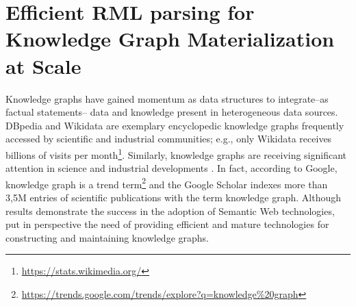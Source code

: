 \section{Efficient RML parsing for Knowledge Graph Materialization at Scale}
\label{chap7_rdfizer}
Knowledge graphs have gained momentum as data structures to integrate--as factual statements-- data and knowledge present in heterogeneous data sources. 
DBpedia and Wikidata are exemplary encyclopedic knowledge graphs frequently accessed by scientific and industrial communities; e.g., only Wikidata receives billions of visits per month\footnote{\url{https://stats.wikimedia.org/}}. 
Similarly, knowledge graphs are receiving significant attention in science and industrial developments \citep{AuerKPKSV18,NoyGJNPT19}. In fact, according to Google, knowledge graph is a trend term\footnote{\url{https://trends.google.com/trends/explore?q=knowledge\%20graph}} and the Google Scholar indexes more than 3,5M entries of scientific publications with the term knowledge graph.
Although results demonstrate the success in the adoption of Semantic Web technologies, put in perspective the need of providing efficient and mature technologies for constructing and maintaining knowledge graphs. 

   


